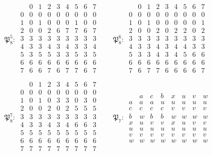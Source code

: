 \documentclass[11pt]{amsart}
\theoremstyle{definition}
\begin{document}
{\begin{gather*}
\mathfrak P_8^{5}:\ \begin{array}{c|cccccccc} & 0 & 1 & 2 & 3 & 4 & 5 & 6 & 7\\ \hline 0 & 0 & 0 & 0 & 0 & 0 & 0 & 0 & 0\\ 1 & 0 & 1 & 0 & 0 & 0 & 1 & 0 & 0\\ 2 & 0 & 0 & 2 & 6 & 7 & 7 & 6 & 7\\ 3 & 3 & 3 & 3 & 3 & 3 & 3 & 3 & 3\\ 4 & 3 & 3 & 4 & 3 & 4 & 3 & 3 & 4\\ 5 & 3 & 5 & 5 & 3 & 3 & 5 & 3 & 5\\ 6 & 6 & 6 & 6 & 6 & 6 & 6 & 6 & 6\\ 7 & 6 & 6 & 7 & 6 & 7 & 7 & 6 & 7\\\end{array}\qquad \mathfrak P_8^{6}:\ \begin{array}{c|cccccccc} & 0 & 1 & 2 & 3 & 4 & 5 & 6 & 7\\ \hline 0 & 0 & 0 & 0 & 0 & 0 & 0 & 0 & 0\\ 1 & 0 & 1 & 0 & 0 & 0 & 0 & 0 & 1\\ 2 & 0 & 0 & 2 & 0 & 2 & 2 & 0 & 2\\ 3 & 3 & 3 & 3 & 3 & 3 & 3 & 3 & 3\\ 4 & 3 & 3 & 4 & 3 & 4 & 4 & 3 & 3\\ 5 & 3 & 3 & 4 & 3 & 4 & 5 & 6 & 6\\ 6 & 6 & 6 & 6 & 6 & 6 & 6 & 6 & 6\\ 7 & 6 & 7 & 7 & 6 & 6 & 6 & 6 & 7\\\end{array}\\[1ex]
\mathfrak P_8^{7}:\ \begin{array}{c|cccccccc} & 0 & 1 & 2 & 3 & 4 & 5 & 6 & 7\\ \hline 0 & 0 & 0 & 0 & 0 & 0 & 0 & 0 & 0\\ 1 & 0 & 1 & 0 & 3 & 3 & 0 & 3 & 0\\ 2 & 0 & 0 & 2 & 0 & 2 & 5 & 5 & 5\\ 3 & 3 & 3 & 3 & 3 & 3 & 3 & 3 & 3\\ 4 & 3 & 3 & 4 & 3 & 4 & 6 & 6 & 3\\ 5 & 5 & 5 & 5 & 5 & 5 & 5 & 5 & 5\\ 6 & 6 & 6 & 6 & 6 & 6 & 6 & 6 & 6\\ 7 & 7 & 7 & 7 & 7 & 7 & 7 & 7 & 7\\\end{array}\qquad
\mathfrak P_7:\ \begin{array}{c|ccccccc}
 & a & c & b & x & u & v & w\\ \hline
a & a & a & u & u & u & u & u\\
c & c & c & c & v & v & v & v\\
b & w & b & b & w & w & w & w\\
x & u & v & v & x & u & v & v\\
u & u & u & u & u & u & u & u\\
v & v & v & v & v & v & v & v\\
w & w & w & w & w & w & w & w
\end{array}
\end{gather*}}
\end{document}
